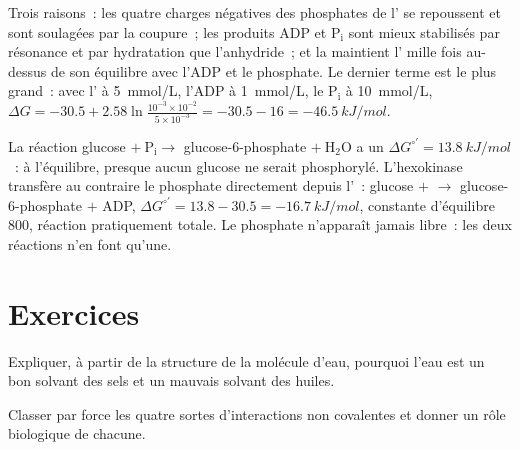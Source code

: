 \begin{example}\label{ex:b1:water-small-molecules:whyatp}
Trois raisons~: les quatre charges négatives des phosphates de l' se
repoussent et sont soulagées par la coupure~; les produits
$\mathrm{ADP}$ et $\mathrm{P_i}$ sont mieux stabilisés par résonance et
par hydratation que l'anhydride~; et la  maintient l' mille
fois au-dessus de son équilibre avec l'ADP et le phosphate. Le dernier
terme est le plus grand~: avec l' à \qty{5}{mmol/L}, l'ADP à
\qty{1}{mmol/L}, le $\mathrm{P_i}$ à \qty{10}{mmol/L},
$\Delta G = -30.5 + 2.58\ln\frac{10^{-3}\times 10^{-2}}{5\times 10^{-3}}
= -30.5 - 16 = \qty{-46.5}{kJ/mol}$.
\end{example}

\begin{example}[Le couplage]\label{ex:b1:water-small-molecules:coupling}
La réaction glucose $+\ \mathrm{P_i} \to$ glucose-6-phosphate
$+\ \mathrm{H_2O}$ a un $\Delta G^{\circ\prime} = \qty{+13.8}{kJ/mol}$~:
à l'équilibre, presque aucun glucose ne serait phosphorylé.
L'hexokinase transfère au contraire le phosphate directement depuis
l'~: glucose $+$  $\to$ glucose-6-phosphate $+$ ADP,
$\Delta G^{\circ\prime} = 13.8 - 30.5 =
\qty{-16.7}{kJ/mol}$, constante d'équilibre $800$, réaction
pratiquement totale. Le phosphate n'apparaît jamais libre~: les deux
réactions n'en font qu'une.
\end{example}

\section{Exercices}

\begin{exercise}[$\star$]\label{exo:b1:water-small-molecules:1}
Expliquer, à partir de la structure de la molécule d'eau, pourquoi
l'eau est un bon solvant des sels et un mauvais solvant des huiles.
\end{exercise}

\begin{exercise}[$\star$]\label{exo:b1:water-small-molecules:2}
Classer par force les quatre sortes d'interactions non covalentes et
donner un rôle biologique de chacune.
\end{exercise}

